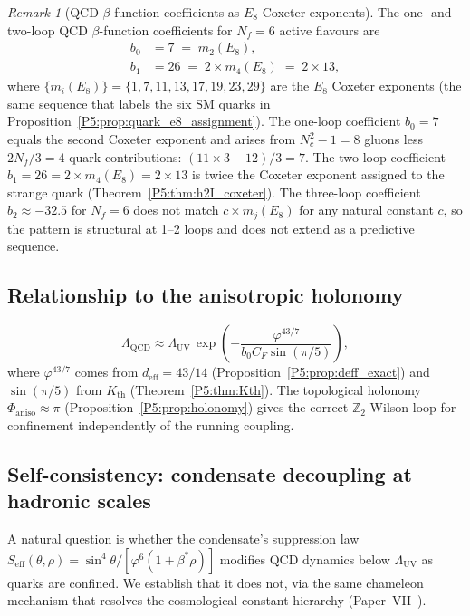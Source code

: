 \documentclass[11pt,a4paper]{article}
\theoremstyle{definition}
\theoremstyle{remark}
\newtheorem{remark}[theorem]{Remark}
\newcommand{\vp}{\varphi}
\newcommand{\bst}{\beta^{*}}
\newcommand{\LUV}{\Lambda_{\mathrm{UV}}}
\newcommand{\LQCD}{\Lambda_{\mathrm{QCD}}}
\newcommand{\deff}{d_{\mathrm{eff}}}
\begin{document}
\begin{remark}[QCD $\beta$-function coefficients as $E_8$ Coxeter exponents]
\label{P5:rem:beta_coxeter}
The one- and two-loop QCD $\beta$-function coefficients for $N_f=6$ active flavours are
\begin{align}
  b_0 &= 7 \;=\; m_2(E_8),
  \label{P5:eq:b0_coxeter}\\
  b_1 &= 26 \;=\; 2\times m_4(E_8) \;=\; 2\times13,
  \label{P5:eq:b1_coxeter}
\end{align}
where $\{m_i(E_8)\}=\{1,7,11,13,17,19,23,29\}$ are the $E_8$ Coxeter exponents
(the same sequence that labels the six SM quarks in
Proposition~\ref{P5:prop:quark_e8_assignment}).
The one-loop coefficient $b_0=7$ equals the second Coxeter exponent and
arises from $N_c^2-1=8$ gluons less $2N_f/3=4$ quark contributions:
$(11\times3-12)/3=7$.
The two-loop coefficient $b_1=26=2\times m_4(E_8)=2\times13$ is twice
the Coxeter exponent assigned to the strange quark
(Theorem~\ref{P5:thm:h2I_coxeter}).
The three-loop coefficient $b_2\approx-32.5$ for $N_f=6$ does not match
$c\times m_j(E_8)$ for any natural constant $c$, so the pattern is
structural at 1--2 loops and does not extend as a predictive sequence.
\end{remark}

\subsection{Relationship to the anisotropic holonomy}
\begin{equation}
  \LQCD \approx \LUV\,\exp\!\left(-\frac{\vp^{43/7}}{b_0 C_F \sin(\pi/5)}\right),
  \label{P5:eq:LQCD_holonomy}
\end{equation}
where $\vp^{43/7}$ comes from $\deff=43/14$ (Proposition~\ref{P5:prop:deff_exact})
and $\sin(\pi/5)$ from $K_{\mathrm{th}}$ (Theorem~\ref{P5:thm:Kth}).
The topological holonomy $\Phi_{\mathrm{aniso}}\approx\pi$
(Proposition~\ref{P5:prop:holonomy}) gives the correct
$\mathbb{Z}_2$ Wilson loop for confinement independently of the
running coupling.

\subsection{Self-consistency: condensate decoupling at hadronic scales}
\label{P5:sec:decoupling}

A natural question is whether the condensate's suppression law
$S_{\mathrm{eff}}(\theta,\rho) = \sin^4\!\theta/[\vp^6(1+\bst\rho)]$
modifies QCD dynamics below $\LUV$ as quarks are confined.
We establish that it does not, via the same chameleon mechanism
that resolves the cosmological constant hierarchy (Paper~VII~\cite{Paper7}).
\end{document}
